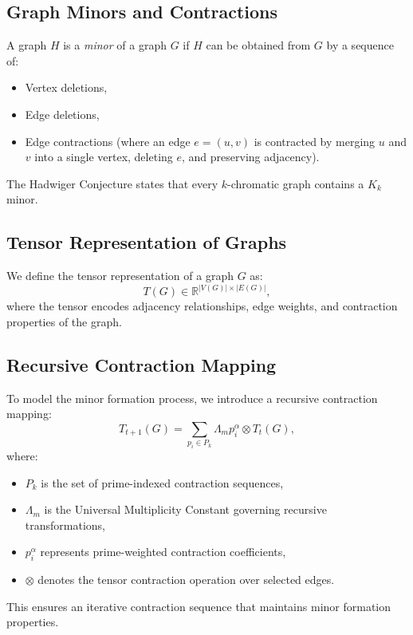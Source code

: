 \documentclass[11pt]{article}
\theoremstyle{plain}
\begin{document}
\subsection{Graph Minors and Contractions}
A graph $H$ is a \textit{minor} of a graph $G$ if $H$ can be obtained from $G$ by a sequence of:
\begin{itemize}
    \item Vertex deletions,
    \item Edge deletions,
    \item Edge contractions (where an edge $e = (u, v)$ is contracted by merging $u$ and $v$ into a single vertex, deleting $e$, and preserving adjacency).
\end{itemize}
The Hadwiger Conjecture states that every $k$-chromatic graph contains a $K_k$ minor.

\subsection{Tensor Representation of Graphs}
We define the tensor representation of a graph $G$ as:
\begin{equation}
    T(G) \in \mathbb{R}^{|V(G)| \times |E(G)|},
\end{equation}
where the tensor encodes adjacency relationships, edge weights, and contraction properties of the graph.

\subsection{Recursive Contraction Mapping}
To model the minor formation process, we introduce a recursive contraction mapping:
\begin{equation}
    T_{t+1}(G) = \sum_{p_i \in P_k} \Lambda_m p_i^\alpha \otimes T_t(G),
\end{equation}
where:
\begin{itemize}
    \item $P_k$ is the set of prime-indexed contraction sequences,
    \item $\Lambda_m$ is the Universal Multiplicity Constant governing recursive transformations,
    \item $p_i^\alpha$ represents prime-weighted contraction coefficients,
    \item $\otimes$ denotes the tensor contraction operation over selected edges.
\end{itemize}
This ensures an iterative contraction sequence that maintains minor formation properties.
\end{document}
